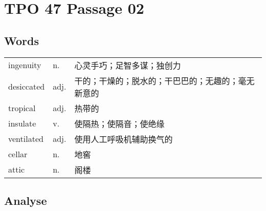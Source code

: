 \section{TPO 47 Passage 02}

\subsection{Words}

\begin{tabular}{lll}
    ingenuity  & n.   & 心灵手巧；足智多谋；独创力             \\
    desiccated & adj. & 干的；干燥的；脱水的；干巴巴的；无趣的；毫无新意的 \\
    tropical   & adj. & 热带的                       \\
    insulate   & v.   & 使隔热；使隔音；使绝缘               \\
    ventilated & adj. & 使用人工呼吸机辅助换气的              \\
    cellar     & n.   & 地窖                        \\
    attic      & n.   & 阁楼                        \\
\end{tabular}

\subsection{Analyse}

